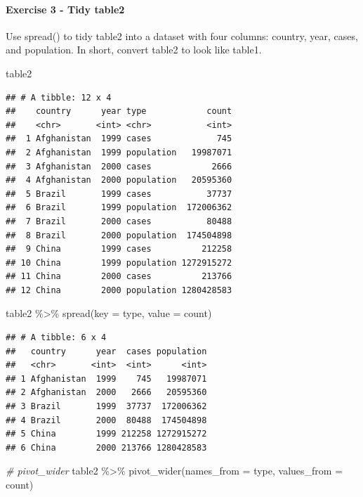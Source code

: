 \documentclass[
]{article}
\newenvironment{Shaded}{\begin{snugshade}}{\end{snugshade}}
\newcommand{\AttributeTok}[1]{\textcolor[rgb]{0.77,0.63,0.00}{#1}}
\newcommand{\CommentTok}[1]{\textcolor[rgb]{0.56,0.35,0.01}{\textit{#1}}}
\newcommand{\FunctionTok}[1]{\textcolor[rgb]{0.00,0.00,0.00}{#1}}
\newcommand{\NormalTok}[1]{#1}
\newcommand{\SpecialCharTok}[1]{\textcolor[rgb]{0.00,0.00,0.00}{#1}}
\begin{document}
\hypertarget{exercise-3---tidy-table2}{%
\paragraph{Exercise 3 - Tidy table2}\label{exercise-3---tidy-table2}}

Use spread() to tidy table2 into a dataset with four columns: country,
year, cases, and population. In short, convert table2 to look like
table1.

\begin{Shaded}
\begin{Highlighting}[]
\NormalTok{table2}
\end{Highlighting}
\end{Shaded}

\begin{verbatim}
## # A tibble: 12 x 4
##    country      year type            count
##    <chr>       <int> <chr>           <int>
##  1 Afghanistan  1999 cases             745
##  2 Afghanistan  1999 population   19987071
##  3 Afghanistan  2000 cases            2666
##  4 Afghanistan  2000 population   20595360
##  5 Brazil       1999 cases           37737
##  6 Brazil       1999 population  172006362
##  7 Brazil       2000 cases           80488
##  8 Brazil       2000 population  174504898
##  9 China        1999 cases          212258
## 10 China        1999 population 1272915272
## 11 China        2000 cases          213766
## 12 China        2000 population 1280428583
\end{verbatim}

\begin{Shaded}
\begin{Highlighting}[]
\NormalTok{table2 }\SpecialCharTok{\%\textgreater{}\%} \FunctionTok{spread}\NormalTok{(}\AttributeTok{key =}\NormalTok{ type, }\AttributeTok{value =}\NormalTok{ count)}
\end{Highlighting}
\end{Shaded}

\begin{verbatim}
## # A tibble: 6 x 4
##   country      year  cases population
##   <chr>       <int>  <int>      <int>
## 1 Afghanistan  1999    745   19987071
## 2 Afghanistan  2000   2666   20595360
## 3 Brazil       1999  37737  172006362
## 4 Brazil       2000  80488  174504898
## 5 China        1999 212258 1272915272
## 6 China        2000 213766 1280428583
\end{verbatim}

\begin{Shaded}
\begin{Highlighting}[]
\CommentTok{\# pivot\_wider}
\NormalTok{table2 }\SpecialCharTok{\%\textgreater{}\%} \FunctionTok{pivot\_wider}\NormalTok{(}\AttributeTok{names\_from =}\NormalTok{ type, }\AttributeTok{values\_from =}\NormalTok{ count)}
\end{Highlighting}
\end{Shaded}
\end{document}

